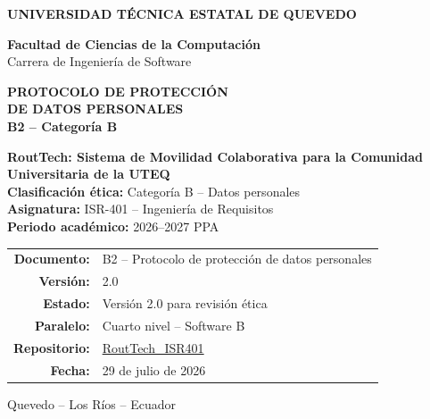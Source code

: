 \documentclass[10pt,a4paper]{article}
\newcommand{\Proyecto}{RoutTech: Sistema de Movilidad Colaborativa para la Comunidad Universitaria de la UTEQ}
\newcommand{\Asignatura}{ISR-401 -- Ingeniería de Requisitos}
\newcommand{\Periodo}{2026--2027 PPA}
\newcommand{\CategoriaEtica}{Categoría B -- Datos personales}
\newcommand{\Repositorio}{https://github.com/AnderJM3/RoutTech_ISR401}
\newcommand{\FechaDocumento}{29 de julio de 2026}
\newcommand{\VersionDocumento}{2.0}
\newcommand{\Paralelo}{Cuarto nivel -- Software B}
\newcommand{\EstadoDocumento}{Versión 2.0 para revisión ética}
\begin{document}
\justifying

\thispagestyle{empty}

\vspace*{0.65cm}
\begin{center}
{\color{white}\Large\bfseries UNIVERSIDAD TÉCNICA ESTATAL DE QUEVEDO}

\vspace{1.75cm}
{\large\bfseries\color{RTForest} Facultad de Ciencias de la Computación\\[4pt]}
{\normalsize\color{RTGray} Carrera de Ingeniería de Software}

\vspace{0.8cm}

{\Huge\bfseries\color{RTForest} PROTOCOLO DE PROTECCIÓN\\[5pt] DE DATOS PERSONALES\\[8pt]}
{\Large\bfseries\color{RTTerracotta} B2 -- Categoría B}

\vspace{1.0cm}

\begin{tcolorbox}[width=0.90\textwidth,colback=RTCream,colframe=RTGold,boxrule=1pt,arc=2mm]
\centering
{\large\bfseries \Proyecto}\\[7pt]
\textbf{Clasificación ética:} \CategoriaEtica\\
\textbf{Asignatura:} \Asignatura\\
\textbf{Periodo académico:} \Periodo
\end{tcolorbox}

\vfill
\begin{tabular}{rl}
\textbf{Documento:} & B2 -- Protocolo de protección de datos personales\\
\textbf{Versión:} & \VersionDocumento\\
\textbf{Estado:} & \EstadoDocumento\\
\textbf{Paralelo:} & \Paralelo\\
\textbf{Repositorio:} & \href{\Repositorio}{RoutTech\_ISR401}\\
\textbf{Fecha:} & \FechaDocumento
\end{tabular}

\vspace{0.75cm}
{\small Quevedo -- Los Ríos -- Ecuador}
\end{center}
\clearpage
\end{document}
